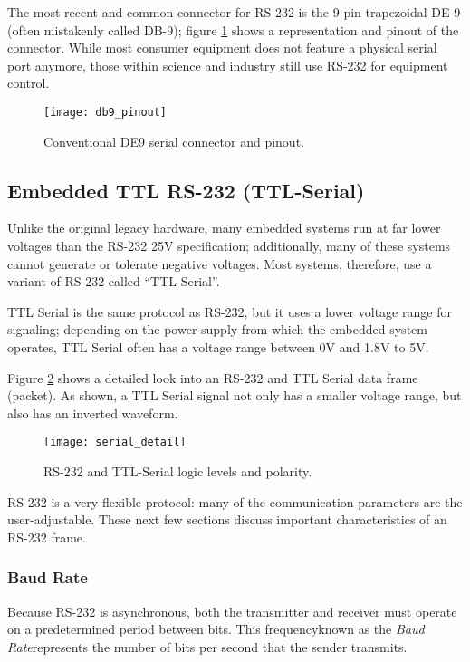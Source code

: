 \documentclass[openany,11pt,fleqn]{book} %
\begin{document}
The most recent and common connector for RS-232 is the 9-pin trapezoidal DE-9 (often mistakenly called DB-9); figure \ref{db9_pinout} shows a representation and pinout of the connector. While most consumer equipment does not feature a physical serial port anymore, those within science and industry still use RS-232 for equipment control.  


\begin{figure}[]
    \centering\texttt{[image: db9\_pinout]}
    \caption{Conventional DE9 serial connector and pinout.}
    \label{db9_pinout}
\end{figure} 

\subsection{Embedded TTL RS-232 (TTL-Serial)}
Unlike the original legacy hardware, many embedded systems run at far lower voltages than the  RS-232 {\textpm}25V specification; additionally, many of these systems cannot generate or tolerate negative voltages. Most systems, therefore, use a variant of RS-232 called ``TTL Serial''.

TTL Serial is the same protocol as RS-232, but it uses a lower voltage range for signaling; depending on the power supply from which the embedded system operates, TTL Serial often has a voltage range between 0V and 1.8V to 5V. 

Figure \ref{serial_detail} shows a detailed look into an RS-232 and TTL Serial data frame (packet). As shown, a TTL Serial signal not only has a smaller voltage range, but also has an inverted waveform. 

\begin{figure}[]
    \centering\texttt{[image: serial\_detail]}
    \caption{RS-232 and TTL-Serial logic levels and polarity.}
    \label{serial_detail}
\end{figure}

RS-232 is a very flexible protocol: many of the communication parameters are the user-adjustable. These next few sections discuss important characteristics of an RS-232 frame.  

\subsubsection{Baud Rate} 
Because RS-232 is asynchronous, both the transmitter and receiver must operate on a predetermined period between bits. This frequency\textemdash known as the \textit{Baud Rate}\textemdash represents the number of bits per second that the sender transmits. 
\end{document}
